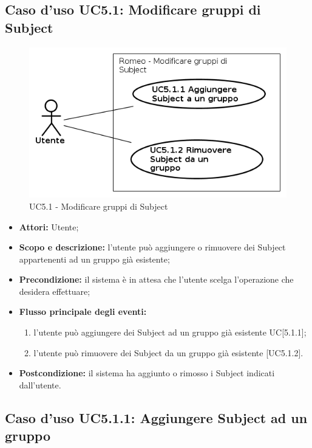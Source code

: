 \subsection{Caso d'uso UC5.1: Modificare gruppi di Subject}
\begin{figure}[!h]
\begin{center}
\includegraphics[scale=0.6]{./img/Use_Case/UC5_1}
\caption{UC5.1 - Modificare gruppi di Subject}
\end{center}
\end{figure}
\begin{itemize}
\item \textbf{Attori:} Utente;
\item \textbf{Scopo e descrizione:} l'utente può aggiungere o rimuovere dei Subject\glossario{} appartenenti ad un gruppo già esistente;
\item \textbf{Precondizione:} il sistema è in attesa che l'utente scelga l'operazione che desidera effettuare;
\item \textbf{Flusso principale degli eventi:}
\begin{enumerate}
\item l'utente può aggiungere dei Subject\glossario{} ad un gruppo già esistente UC[5.1.1];
\item l'utente può rimuovere dei Subject\glossario{} da un gruppo già esistente [UC5.1.2].
\end{enumerate}
\item \textbf{Postcondizione:} il sistema ha aggiunto o rimosso i Subject\glossario{} indicati dall'utente.
\end{itemize}

\subsection{Caso d'uso UC5.1.1: Aggiungere Subject ad un gruppo}

